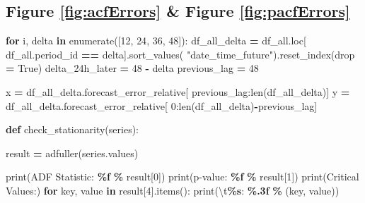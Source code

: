 \documentclass[mstat,12pt]{unswthesis}
\newenvironment{Shaded}{\begin{snugshade}}{\end{snugshade}}
\newcommand{\BuiltInTok}[1]{#1}
\newcommand{\CharTok}[1]{\textcolor[rgb]{0.31,0.60,0.02}{#1}}
\newcommand{\ControlFlowTok}[1]{\textcolor[rgb]{0.13,0.29,0.53}{\textbf{#1}}}
\newcommand{\DecValTok}[1]{\textcolor[rgb]{0.00,0.00,0.81}{#1}}
\newcommand{\KeywordTok}[1]{\textcolor[rgb]{0.13,0.29,0.53}{\textbf{#1}}}
\newcommand{\NormalTok}[1]{#1}
\newcommand{\OperatorTok}[1]{\textcolor[rgb]{0.81,0.36,0.00}{\textbf{#1}}}
\newcommand{\SpecialCharTok}[1]{\textcolor[rgb]{0.81,0.36,0.00}{\textbf{#1}}}
\newcommand{\StringTok}[1]{\textcolor[rgb]{0.31,0.60,0.02}{#1}}
\newcommand{\VariableTok}[1]{\textcolor[rgb]{0.00,0.00,0.00}{#1}}
\begin{document}
\subsection*{Figure \ref{fig:acfErrors} \& Figure \ref{fig:pacfErrors}}\label{figure-reffigacferrors-figure-reffigpacferrors}

\begin{Shaded}
\begin{Highlighting}[]
\ControlFlowTok{for}\NormalTok{ i, delta }\KeywordTok{in} \BuiltInTok{enumerate}\NormalTok{([}\DecValTok{12}\NormalTok{, }\DecValTok{24}\NormalTok{, }\DecValTok{36}\NormalTok{, }\DecValTok{48}\NormalTok{]):}
\NormalTok{    df\_all\_delta }\OperatorTok{=}\NormalTok{ df\_all.loc[}
\NormalTok{      df\_all.period\_id }\OperatorTok{==}\NormalTok{ delta].sort\_values(}
        \StringTok{"date\_time\_future"}\NormalTok{).reset\_index(drop }\OperatorTok{=} \VariableTok{True}\NormalTok{)}
\NormalTok{    delta\_24h\_later }\OperatorTok{=} \DecValTok{48} \OperatorTok{{-}}\NormalTok{ delta}
\NormalTok{    previous\_lag }\OperatorTok{=} \DecValTok{48}

\NormalTok{    x }\OperatorTok{=}\NormalTok{ df\_all\_delta.forecast\_error\_relative[}
\NormalTok{        previous\_lag:}\BuiltInTok{len}\NormalTok{(df\_all\_delta)]}
\NormalTok{    y }\OperatorTok{=}\NormalTok{ df\_all\_delta.forecast\_error\_relative[}
        \DecValTok{0}\NormalTok{:}\BuiltInTok{len}\NormalTok{(df\_all\_delta)}\OperatorTok{{-}}\NormalTok{previous\_lag]}
    
\KeywordTok{def}\NormalTok{ check\_stationarity(series):}

\NormalTok{    result }\OperatorTok{=}\NormalTok{ adfuller(series.values)}

    \BuiltInTok{print}\NormalTok{(}\StringTok{\textquotesingle{}ADF Statistic: }\SpecialCharTok{\%f}\StringTok{\textquotesingle{}} \OperatorTok{\%}\NormalTok{ result[}\DecValTok{0}\NormalTok{])}
    \BuiltInTok{print}\NormalTok{(}\StringTok{\textquotesingle{}p{-}value: }\SpecialCharTok{\%f}\StringTok{\textquotesingle{}} \OperatorTok{\%}\NormalTok{ result[}\DecValTok{1}\NormalTok{])}
    \BuiltInTok{print}\NormalTok{(}\StringTok{\textquotesingle{}Critical Values:\textquotesingle{}}\NormalTok{)}
    \ControlFlowTok{for}\NormalTok{ key, value }\KeywordTok{in}\NormalTok{ result[}\DecValTok{4}\NormalTok{].items():}
        \BuiltInTok{print}\NormalTok{(}\StringTok{\textquotesingle{}}\CharTok{\textbackslash{}t}\SpecialCharTok{\%s}\StringTok{: }\SpecialCharTok{\%.3f}\StringTok{\textquotesingle{}} \OperatorTok{\%}\NormalTok{ (key, value))}


\end{Highlighting}
\end{Shaded}
\end{document}
